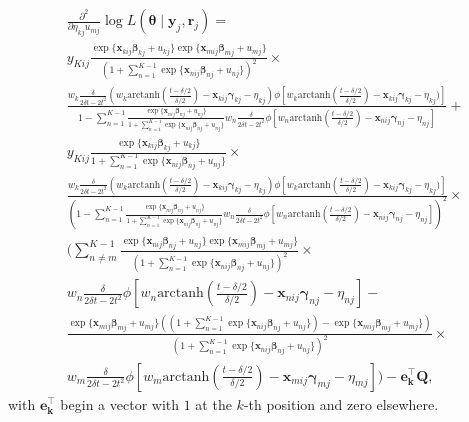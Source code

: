\documentclass[12pt, %
               openright, %
               oneside, %
               a4paper, %
               chapter=TITLE, %
               section=TITLE, %
               brazil,
               english %
]{abntex2}
\begin{document}
\begin{apendicesenv}
\begin{align*}
  &\frac{\partial^{2}}{\partial \eta_{kj} u_{mj}}
    \log L(\bm{\theta}\mid\bm{y}_{j}, \bm{r}_{j}) =\\
  &y_{Kij}
    \frac{\exp\{\bm{x}_{kij}\bm{\beta}_{kj} + u_{kj}\}
    \exp\{\bm{x}_{mij}\bm{\beta}_{mj} + u_{mj}\}}{
    \left(1 +
    \sum_{n = 1}^{K-1}\exp\{\bm{x}_{nij}\bm{\beta}_{nj} + u_{nj}\}
    \right)^{2}}\times\\
  &\frac{
    w_{k}\frac{\delta}{2\delta t - 2t^{2}}
    (w_{k} \text{arctanh}\left(\frac{t-\delta/2}{\delta/2}\right)
    - \bm{x}_{kij}\bm{\gamma}_{kj} - \eta_{kj})
    \phi[w_{k}\text{arctanh}\left(\frac{t-\delta/2}{\delta/2}\right)
    - \bm{x}_{kij}\bm{\gamma}_{kj} - \eta_{kj})]}{1 - \sum_{n = 1}^{K-1}
    \frac{\exp\{\bm{x}_{nij}\bm{\beta}_{nj} + u_{nj}\}}{1 +
    \sum_{n = 1}^{K-1}\exp\{\bm{x}_{nij}\bm{\beta}_{nj} + u_{nj}\}}
    w_{n}\frac{\delta}{2\delta t - 2t^{2}}
    \phi[w_{n}\text{arctanh}\left(\frac{t-\delta/2}{\delta/2}\right)
    - \bm{x}_{nij}\bm{\gamma}_{nj} - \eta_{nj}]} +\\
  &y_{Kij}
    \frac{\exp\{\bm{x}_{kij}\bm{\beta}_{kj} + u_{kj}\}}{1 +
    \sum_{n = 1}^{K-1}\exp\{\bm{x}_{nij}\bm{\beta}_{nj} + u_{nj}\}}\times\\
  &\frac{
    w_{k}\frac{\delta}{2\delta t - 2t^{2}}
    (w_{k}\text{arctanh}\left(\frac{t-\delta/2}{\delta/2}\right)
    - \bm{x}_{kij}\bm{\gamma}_{kj} - \eta_{kj})
    \phi[w_{k}\text{arctanh}\left(\frac{t-\delta/2}{\delta/2}\right)
    - \bm{x}_{kij}\bm{\gamma}_{kj} - \eta_{kj})]}{
    \left(1 - \sum_{n = 1}^{K-1}
    \frac{\exp\{\bm{x}_{nij}\bm{\beta}_{nj} + u_{nj}\}}{1 +
    \sum_{n = 1}^{K-1}\exp\{\bm{x}_{nij}\bm{\beta}_{nj} + u_{nj}\}}
    w_{n}\frac{\delta}{2\delta t - 2t^{2}}
    \phi[w_{n}\text{arctanh}\left(\frac{t-\delta/2}{\delta/2}\right)
    - \bm{x}_{nij}\bm{\gamma}_{nj} - \eta_{nj}]\right)^{2}}\times\\
  &\Bigg(
    \sum_{n \neq m}^{K-1}\frac{
    \exp\{\bm{x}_{nij}\bm{\beta}_{nj} + u_{nj}\}
    \exp\{\bm{x}_{mij}\bm{\beta}_{mj} + u_{mj}\}}{
    \left(1 +
    \sum_{n = 1}^{K-1}\exp\{\bm{x}_{nij}\bm{\beta}_{nj} + u_{nj}\}
    \right)^{2}}\times\\
  &w_{n}\frac{\delta}{2\delta t - 2t^{2}}
    \phi[w_{n}\text{arctanh}\left(\frac{t-\delta/2}{\delta/2}\right)
    - \bm{x}_{nij}\bm{\gamma}_{nj} - \eta_{nj}] -\\
  &\frac{\exp\{\bm{x}_{mij}\bm{\beta}_{mj} + u_{mj}\}
    \left(
    \left(1 +
    \sum_{n = 1}^{K-1}\exp\{\bm{x}_{nij}\bm{\beta}_{nj} + u_{nj}\}
    \right) - \exp\{\bm{x}_{mij} \bm{\beta}_{mj} + u_{mj}\}
    \right)}{
    \left(1 + \sum_{n = 1}^{K-1}\exp\{\bm{x}_{nij}\bm{\beta}_{nj} + u_{nj}\}
    \right)^{2}}\times\\
  &w_{m}\frac{\delta}{2\delta t - 2t^{2}}
    \phi[w_{m}\text{arctanh}\left(\frac{t-\delta/2}{\delta/2}\right)
    - \bm{x}_{mij}\bm{\gamma}_{mj} - \eta_{mj}]\Bigg) - \bm{e_{k}^{\top}Q},
\end{align*}
with \(\bm{e_{k}^{\top}}\) begin a vector with \(1\) at the \(k\)-th
position and zero elsewhere.


\end{apendicesenv}
\end{document}
